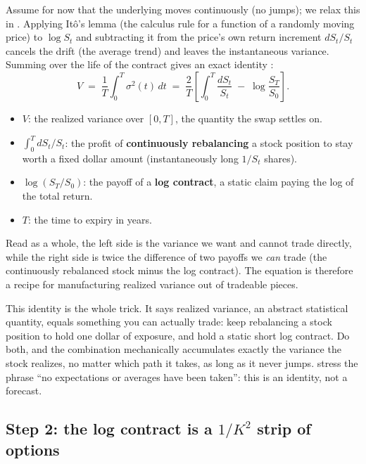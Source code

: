 Assume for now that the underlying moves continuously (no jumps); we relax this in . Applying It\^o's lemma (the calculus rule for a function of a randomly moving price) to $\log S_t$ and subtracting it from the price's own return increment $dS_t/S_t$ cancels the drift (the average trend) and leaves the instantaneous variance. Summing over the life of the contract gives an exact identity \citep[Eq.~20, p.~17]{Demeterfi1999}:
\begin{equation}
\label{eq:gsvivs:logcontract}
V \;=\; \frac{1}{T}\int_0^T \sigma^2(t)\,dt \;=\; \frac{2}{T}\left[\int_0^T \frac{dS_t}{S_t} \;-\; \log\frac{S_T}{S_0}\right].
\end{equation}
\begin{itemize}
  \item $V$: the realized variance over $[0,T]$, the quantity the swap settles on.
  \item $\int_0^T dS_t/S_t$: the profit of \textbf{continuously rebalancing} a stock position to stay worth a fixed dollar amount (instantaneously long $1/S_t$ shares).
  \item $\log(S_T/S_0)$: the payoff of a \textbf{log contract}, a static claim paying the log of the total return.
  \item $T$: the time to expiry in years.
\end{itemize}
Read as a whole, the left side is the variance we want and cannot trade directly, while the right side is twice the difference of two payoffs we \emph{can} trade (the continuously rebalanced stock minus the log contract). The equation is therefore a recipe for manufacturing realized variance out of tradeable pieces.

\begin{intuition}
This identity is the whole trick. It says realized variance, an abstract statistical quantity, equals something you can actually trade: keep rebalancing a stock position to hold one dollar of exposure, and hold a static short log contract. Do both, and the combination mechanically accumulates exactly the variance the stock realizes, no matter which path it takes, as long as it never jumps. \citet{Demeterfi1999} stress the phrase ``no expectations or averages have been taken'': this is an identity, not a forecast.
\end{intuition}

\subsection*{Step 2: the log contract is a $1/K^2$ strip of options}

